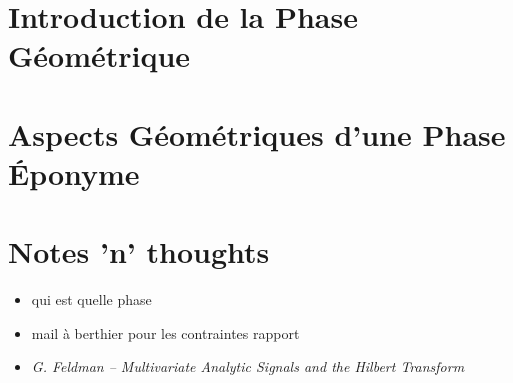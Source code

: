 \newpage








\part{Introduction de la Phase Géométrique} \label{part:param_instant} 




\part{Aspects Géométriques d'une Phase Éponyme} \label{part:phase_geo} 




\part{Notes 'n' thoughts} 
	
	


	



\newpage
\begin{itemize}
	\item qui est quelle phase
	\item mail à berthier pour les contraintes rapport
	\item \textit{G. Feldman – Multivariate Analytic Signals and the Hilbert Transform}
\end{itemize}
	
	
	

\newpage

\listoffigures
\vfill
\lstlistoflistings
\vfill

\newpage

{}


